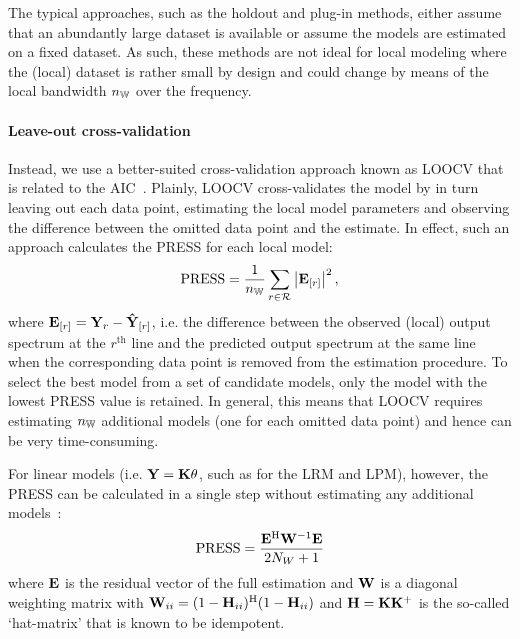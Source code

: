 \begin{remark}
The typical approaches, such as the holdout and plug-in methods, either assume that an abundantly large dataset is available or  assume the models are estimated on a fixed dataset.
As such, these methods are not ideal for local modeling where the (local) dataset is rather small by design and could change by means of the local bandwidth $\nWind$ over the frequency.
\end{remark}

\paragraph{Leave-out cross-validation}
Instead, we use a better-suited cross-validation approach known as \gls{LOOCV} that is related to the \gls{AIC}~\citep{Stone1977}.
Plainly, \gls{LOOCV} cross-validates the model by in turn leaving out each data point, estimating the local model parameters and observing the difference between the omitted data point and the estimate.
In effect, such an approach calculates the \gls{PRESS} for each local model:
\begin{equation}
 \PRESS = 
 \frac{1}{\nWind} 
  \sum_{r \in \LocalShifts{}}
    \abs{\ignoring{r}{\LocalVector{E}}}^2
    \text{,}
\label{eq:PRESS-general}
\end{equation}
where $\ignoring{r}{\LocalVector{E}} = \LocalVector{Y}_{r} - \ignoring{r}{\LocalVector{\estimated{Y}}}$, i.e. the difference between the observed (local) output spectrum at the $r^{\text{th}}$ line and the predicted output spectrum at the same line when the corresponding data point is removed from the estimation procedure.
To select the best model from a set of candidate models, only the model with the lowest \gls{PRESS} value is retained.
In general, this means that \gls{LOOCV} requires estimating $\nWind$ additional models (one for each omitted data point) and hence can be very time-consuming.

For linear models (i.e. $\LocalVector{Y} = \LocalMatrix{K} \LocalVector{\theta}$, such as for the \gls{LRM} and \gls{LPM}), however, the \gls{PRESS} can be calculated in a single step without estimating any additional models~\citep[Sec.~12.3.2]{Seber2003}:
\begin{equation}
\PRESS = \frac{\LocalVector{E}^{\HT} \LocalVector{W}^{-1} \LocalVector{E}}{2N_W + 1}
\end{equation}
where $\LocalVector{E}$ is the residual vector of the full estimation and $\LocalVector{W}$ is a diagonal weighting matrix with $\LocalVector{W}_{ii} = (1 - \LocalVector{H}_{ii})^{\HT} (1 - \LocalVector{H}_{ii})$ and
$\LocalVector{H} = \LocalMatrix{K} \pinv{\LocalMatrix{K}}$ is the so-called `hat-matrix' that is known to be idempotent.

